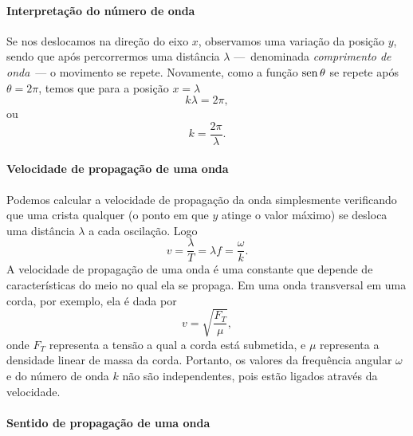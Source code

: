 \paragraph{Interpretação do número de onda}

Se nos deslocamos na direção do eixo $x$, observamos uma variação da posição $y$, sendo que após percorrermos uma distância $\lambda$ ---~denominada \emph{comprimento de onda}~--- o movimento se repete. Novamente, como a função $\operatorname{sen}\theta$ se repete após $\theta = 2\pi$, temos que para a posição $x = \lambda$
\begin{equation}
	k \lambda = 2\pi,
\end{equation}
%
ou
\begin{equation}
	k = \frac{2\pi}{\lambda}.
\end{equation}

\paragraph{Velocidade de propagação de uma onda}

Podemos calcular a velocidade de propagação da onda simplesmente verificando que uma crista qualquer (o ponto em que $y$ atinge o valor máximo) se desloca uma distância $\lambda$ a cada oscilação. Logo
\begin{equation}\label{Eq:RelVelFreqAngNumOnda}
	v = \frac{\lambda}{T} = \lambda f = \frac{\omega}{k}.
\end{equation}
%
A velocidade de propagação de uma onda é uma constante que depende de características do meio no qual ela se propaga. Em uma onda transversal em uma corda, por exemplo, ela é dada por
\begin{equation}\label{Eq:VelocidadeOndaEmUmaCorda}
    v = \sqrt{\frac{F_T}{\mu}},
\end{equation}
%
onde $F_T$ representa a tensão a qual a corda está submetida, e $\mu$ representa a densidade linear de massa da corda. Portanto, os valores da frequência angular $\omega$ e do número de onda $k$ não são independentes, pois estão ligados através da velocidade.

\paragraph{Sentido de propagação de uma onda}


